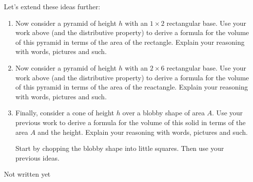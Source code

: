 \documentclass[nooutcomes,noauthor,handout,hints,12pt]{ximera}
\begin{document}
\begin{question}
  Let's extend these ideas further:
  \begin{enumerate}
  \item Now consider a pyramid of height $h$ with an $1\times 2$
    rectangular base. Use your work above (and the distributive
    property) to derive a formula for the volume of this
    pyramid in terms of the area of the rectangle. Explain your reasoning with words, pictures and such.
    \item Now consider a pyramid of height $h$ with an $2\times 6$
    rectangular base. Use your work above (and the distributive
    property) to derive a formula for the volume of this
    pyramid in terms of the area of the reactangle. Explain your reasoning with words, pictures and such.
  \item Finally, consider a cone of height $h$ over a blobby shape of
    area $A$. Use your previous work to derive a formula for the
    volume of this solid in terms of the area $A$ and the height. Explain your reasoning with words, pictures and such.
    \begin{hint}
      Start by chopping the blobby shape into little squares. Then use your previous ideas.
    \end{hint}
  \end{enumerate}
    \begin{freeResponse}
Not written yet
    \end{freeResponse}
\end{question}
\end{document}
